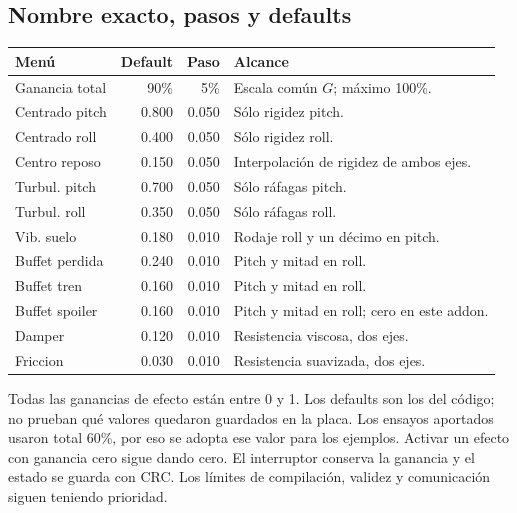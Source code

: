 \documentclass[11pt,a4paper]{article}
\begin{document}
\subsection{Nombre exacto, pasos y defaults}
\begin{longtable}{p{4cm}rrp{6cm}}
\toprule Menú & Default & Paso & Alcance\\\midrule\endhead
Ganancia total & 90\% & 5\% & Escala común $G$; máximo 100\%.\\
Centrado pitch & 0.800 & 0.050 & Sólo rigidez pitch.\\
Centrado roll & 0.400 & 0.050 & Sólo rigidez roll.\\
Centro reposo & 0.150 & 0.050 & Interpolación de rigidez de ambos ejes.\\
Turbul. pitch & 0.700 & 0.050 & Sólo ráfagas pitch.\\
Turbul. roll & 0.350 & 0.050 & Sólo ráfagas roll.\\
Vib. suelo & 0.180 & 0.010 & Rodaje roll y un décimo en pitch.\\
Buffet perdida & 0.240 & 0.010 & Pitch y mitad en roll.\\
Buffet tren & 0.160 & 0.010 & Pitch y mitad en roll.\\
Buffet spoiler & 0.160 & 0.010 & Pitch y mitad en roll; cero en este addon.\\
Damper & 0.120 & 0.010 & Resistencia viscosa, dos ejes.\\
Friccion & 0.030 & 0.010 & Resistencia suavizada, dos ejes.\\\bottomrule
\end{longtable}
Todas las ganancias de efecto están entre 0 y 1. Los defaults son los del código; no prueban qué valores quedaron guardados en la placa. Los ensayos aportados usaron total 60\%, por eso se adopta ese valor para los ejemplos. Activar un efecto con ganancia cero sigue dando cero. El interruptor conserva la ganancia y el estado se guarda con CRC. Los límites de compilación, validez y comunicación siguen teniendo prioridad.
\end{document}
